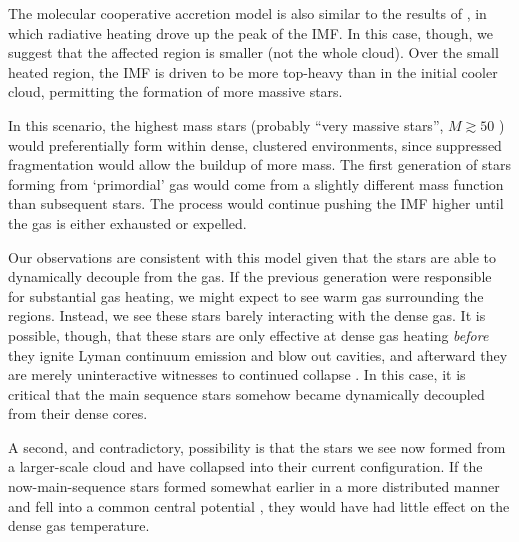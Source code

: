 \documentclass{emulateapj}
\begin{document}

The molecular cooperative accretion model is also similar to the results of
\citet{Krumholz2011a}, in which radiative heating drove up the peak of the IMF.
In this case, though, we suggest that the affected region is smaller (not the
whole cloud).  Over the small heated region, the IMF is driven to be more
top-heavy than in the initial cooler cloud, permitting the formation of more
massive stars.

In this scenario, the highest mass stars (probably ``very massive stars'',
$M\gtrsim50$ \msun) would preferentially form within dense, clustered
environments, since suppressed fragmentation would allow the buildup of
more mass.  The first generation of stars forming from `primordial' gas
would come from a slightly different mass function than subsequent stars.  The
process would continue pushing the IMF higher until the gas is either exhausted
\citep{Kruijssen2012b,Ginsburg2016b} or expelled.

Our observations are consistent with this model given that the stars are able
to dynamically decouple from the gas.  If the previous generation were
responsible for substantial gas heating, we might expect to see warm gas
surrounding the \hchii regions.  Instead, we see these stars barely interacting
with the dense gas.  It is possible, though, that these stars are only
effective at dense gas heating \emph{before} they ignite Lyman continuum
emission and blow out cavities, and afterward they are merely uninteractive
witnesses to continued collapse \citep{Peters2010c}.  In this case, it is
critical that the main sequence stars somehow became dynamically decoupled from
their dense cores.


A second, and contradictory, possibility is that the stars we see now formed
from a larger-scale cloud and have collapsed into their current configuration.
If the now-main-sequence stars formed somewhat earlier in a more distributed
manner and fell into a common central potential \citep[e.g., the `conveyor
belt' scenario for cluster
formation,][]{Ginsburg2012a,Longmore2014a,Walker2016a}, they would have had
little effect on the dense gas temperature.
\end{document}
